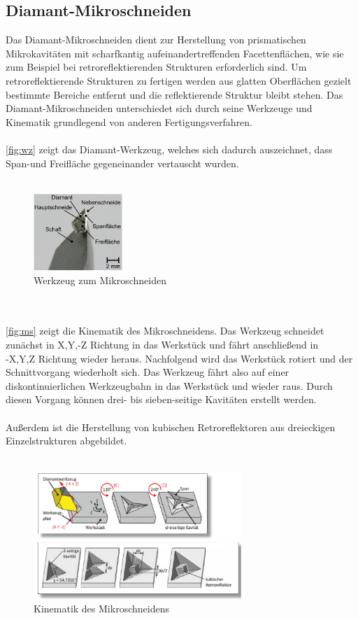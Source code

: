 \documentclass[12pt,a4paper,bibliography=totocnumbered,listof=totocnumbered]{scrartcl}
\begin{document}
\subsection{Diamant-Mikroschneiden}
Das Diamant-Mikroschneiden dient zur Herstellung von prismatischen Mikrokavitäten mit scharfkantig aufeinandertreffenden Facettenflächen, wie sie zum Beispiel bei retroreflektierenden Strukturen erforderlich sind. Um retroreflektierende Strukturen zu fertigen werden aus glatten Oberflächen gezielt bestimmte Bereiche entfernt und die reflektierende Struktur bleibt stehen. Das Diamant-Mikroschneiden unterschiedet sich durch seine Werkzeuge und Kinematik grundlegend von anderen Fertigungsverfahren. \\ \\
\autoref{fig:wz} zeigt das Diamant-Werkzeug, welches sich dadurch auszeichnet, dass Span-und Freifläche gegeneinander vertauscht wurden. \\ \\
\begin{figure}[htbp]
\centering 
\includegraphics[width=0.3\textwidth]{Werkzeug.PNG}
\caption [Gla09]{Werkzeug zum Mikroschneiden}
\label{fig:wz}
\end{figure}
\pagebreak
\\ \\
\autoref{fig:ms} zeigt die Kinematik des Mikroschneidens. Das Werkzeug schneidet zunächst in X,Y,-Z Richtung in das Werkstück und fährt anschließend in \\-X,Y,Z Richtung wieder heraus. Nachfolgend wird das Werkstück rotiert und der Schnittvorgang wiederholt sich. Das Werkzeug fährt also auf einer diskontinuierlichen Werkzeugbahn in das Werkstück und wieder raus. Durch diesen Vorgang können drei- bis sieben-seitige Kavitäten erstellt werden. \\ \\
Außerdem ist die Herstellung von kubischen Retroreflektoren aus dreieckigen Einzelstrukturen abgebildet. \\ \\
\begin{figure}[htbp]
\centering 
\includegraphics[width=0.7\textwidth]{Mikroschneiden_Kinematik.PNG}
\caption[Sch14]{Kinematik des Mikroschneidens}
\label{fig:ms}
\end{figure}
\end{document}
